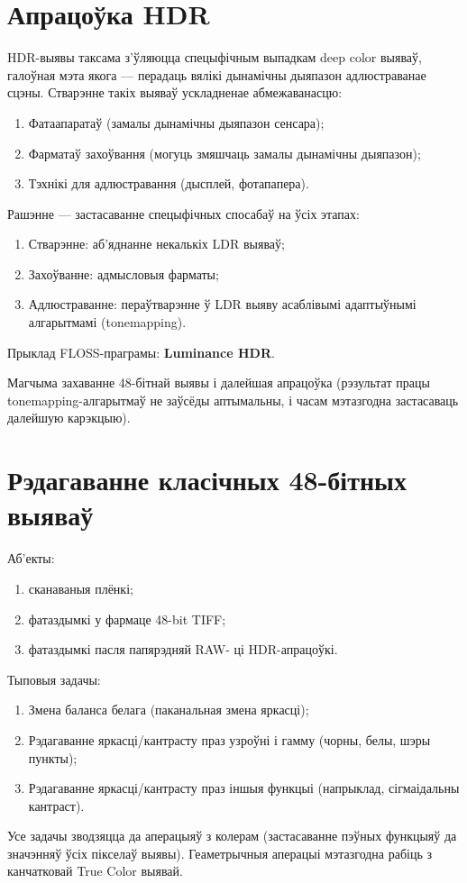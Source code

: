 \documentclass[10pt, a5paper]{article}
\begin{document}
\section*{Апрацоўка HDR}

HDR-выявы таксама з'ўляюцца спецыфічным выпадкам deep color выяваў, галоўная мэта якога --- перадаць вялікі дынамічны дыяпазон адлюстраванае сцэны. Стварэнне такіх выяваў ускладненае абмежаванасцю:
\begin{enumerate}
 \item  Фатаапаратаў (замалы дынамічны дыяпазон сенсара);
\item  Фарматаў захоўвання (могуць змяшчаць замалы дынамічны дыяпазон);
\item  Тэхнікі для адлюстравання (дысплей, фотапапера).
\end{enumerate}
Рашэнне --- застасаванне спецыфічных спосабаў на ўсіх этапах:
\begin{enumerate}
\item  Стварэнне: аб'яднанне некалькіх LDR выяваў;
\item  Захоўванне: адмысловыя фарматы;
\item  Адлюстраванне: пераўтварэнне ў LDR выяву асаблівымі адаптыўнымі алгарытмамі (tonemapping).
\end{enumerate}

Прыклад FLOSS-праграмы: \textbf{Luminance HDR}.

Магчыма захаванне 48-бітнай выявы і далейшая апрацоўка (рэзультат працы tonemapping-алгарытмаў не заўсёды аптымальны, і часам мэтазгодна застасаваць далейшую карэкцыю).

\section*{Рэдагаванне класічных 48-бітных выяваў}

Аб'екты:
\begin{enumerate}
\item сканаваныя плёнкі;
\item фатаздымкі у фармаце 48-bit TIFF;
\item фатаздымкі пасля папярэдняй RAW- ці HDR-апрацоўкі.
\end{enumerate}
Тыповыя задачы:
\begin{enumerate}
\item Змена баланса белага (паканальная змена яркасці);
\item Рэдагаванне яркасці/кантрасту праз узроўні і гамму (чорны, белы, шэры пункты);
\item Рэдагаванне яркасці/кантрасту праз іншыя функцыі \linebreak (напрыклад,  сігмаідальны кантраст).
\end{enumerate}
Усе задачы зводзяцца да аперацыяў з колерам (застасаванне пэўных функцыяў да значэнняў ўсіх пікселаў выявы). Геаметрычныя аперацыі мэтазгодна рабіць з канчатковай True Color выявай.
\end{document}
